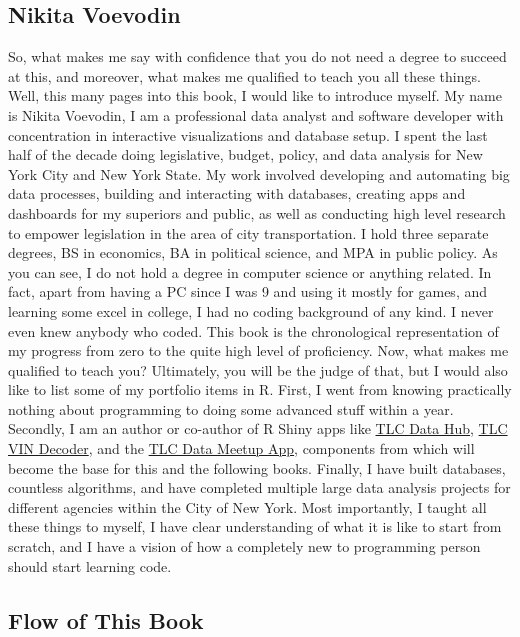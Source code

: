 \documentclass[]{book}
\begin{document}
\hypertarget{nikita-voevodin}{%
\subsection{Nikita Voevodin}\label{nikita-voevodin}}

So, what makes me say with confidence that you do not need a degree to succeed at this, and moreover, what makes me qualified to teach you all these things. Well, this many pages into this book, I would like to introduce myself. My name is Nikita Voevodin, I am a professional data analyst and software developer with concentration in interactive visualizations and database setup. I spent the last half of the decade doing legislative, budget, policy, and data analysis for New York City and New York State. My work involved developing and automating big data processes, building and interacting with databases, creating apps and dashboards for my superiors and public, as well as conducting high level research to empower legislation in the area of city transportation. I hold three separate degrees, BS in economics, BA in political science, and MPA in public policy. As you can see, I do not hold a degree in computer science or anything related. In fact, apart from having a PC since I was 9 and using it mostly for games, and learning some excel in college, I had no coding background of any kind. I never even knew anybody who coded. This book is the chronological representation of my progress from zero to the quite high level of proficiency. Now, what makes me qualified to teach you? Ultimately, you will be the judge of that, but I would also like to list some of my portfolio items in R. First, I went from knowing practically nothing about programming to doing some advanced stuff within a year. Secondly, I am an author or co-author of R Shiny apps like \href{https://tlcanalytics.shinyapps.io/tlc_dash/}{TLC Data Hub}, \href{https://tlcanalytics.shinyapps.io/decoder/}{TLC VIN Decoder}, and the \href{https://tlcanalytics.shinyapps.io/tasks/}{TLC Data Meetup App}, components from which will become the base for this and the following books. Finally, I have built databases, countless algorithms, and have completed multiple large data analysis projects for different agencies within the City of New York. Most importantly, I taught all these things to myself, I have clear understanding of what it is like to start from scratch, and I have a vision of how a completely new to programming person should start learning code.

\hypertarget{flow-of-this-book}{%
\subsection{Flow of This Book}\label{flow-of-this-book}}
\end{document}
